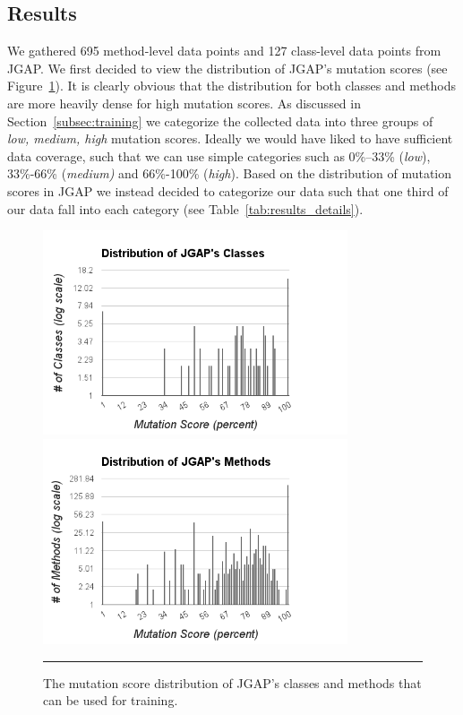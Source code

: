 \documentclass[conference]{IEEEtran}
\begin{document}
\subsection{Results}
\label{subsec:results}
We gathered 695 method-level data points and 127 class-level data points from JGAP. We first decided to view the distribution of JGAP's mutation scores (see Figure~\ref{fig:mutation_distributions}). It is clearly obvious that the distribution for both classes and methods are more heavily dense for high mutation scores. As discussed in Section~\ref{subsec:training} we categorize the collected data into three groups of \textit{low, medium, high} mutation scores. Ideally we would have liked to have sufficient data coverage, such that we can use simple categories such as 0\%--33\% (\textit{low}), 33\%-66\% (\textit{medium)} and 66\%-100\% (\textit{high}). Based on the distribution of mutation scores in JGAP we instead decided to categorize our data such that one third of our data fall into each category (see Table~\ref{tab:results_details}).

\begin{figure}[!t]
  \centering
  \includegraphics[width=9cm]{figures/class_distribution.png}
  \includegraphics[width=9cm]{figures/method_distribution.png}
  \caption{The mutation score distribution of JGAP's classes and methods that can be used for training.}
  \label{fig:mutation_distributions}
  \vspace{2mm}
  \hrule
\end{figure}
\end{document}
